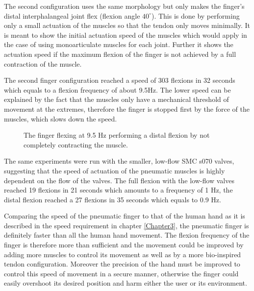 \documentclass[main]{subfiles}
\begin{document}
The second configuration uses the same morphology but only makes the finger's distal interphalangeal joint flex (flexion angle $40^\circ$). This is done by performing only a small actuation of the muscles so that the tendon only moves minimally. It is meant to show the initial actuation speed of the muscles which would apply in the case of using monoarticulate muscles for each joint. Further it shows the actuation speed if the maximum flexion of the finger is not achieved by a full contraction of the muscle.

The second finger configuration reached a speed of 303 flexions in 32 seconds which equals to a flexion frequency of about 9.5Hz. The lower speed can be explained by the fact that the muscles only have a mechanical threshold of movement at the extremes, therefore the finger is stopped first by the force of the muscles, which slows down the speed.

\begin{figure}[H]
\centering
{}\hspace{0.01\textwidth}
\hspace{0.01\textwidth}
\caption[Distal finger flexion at 9.5 Hz]{The finger flexing at 9.5 Hz performing a distal flexion by not completely contracting the muscle.}
\label{distal-flexion}
\end{figure}

The same experiments were run with the smaller, low-flow SMC s070 valves, suggesting that the speed of actuation of the pneumatic muscles is highly dependent on the flow of the valves. The full flexion with the low-flow valves reached 19 flexions in 21 seconds which amounts to a frequency of 1 Hz, the distal flexion reached a 27 flexions in 35 seconds which equals to 0.9 Hz.

Comparing the speed of the pneumatic finger to that of the human hand as it is described in the speed requirement in chapter \ref{Chapter3}, the pneumatic finger is definitely faster than all the human hand movement. The flexion frequency of the finger is therefore more than sufficient and the movement could be improved by adding more muscles to control its movement as well as by a more bio-inspired tendon configuration. Moreover the precision of the hand must be improved to control this speed of movement in a secure manner, otherwise the finger could easily overshoot its desired position and harm either the user or its environment.
\end{document}

